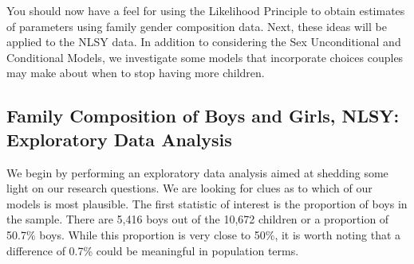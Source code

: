 \documentclass[
]{krantz}
\begin{document}
You should now have a feel for using the Likelihood Principle to obtain estimates of parameters using family gender composition data. Next, these ideas will be applied to the NLSY data. In addition to considering the Sex Unconditional and Conditional Models, we investigate some models that incorporate choices couples may make about when to stop having more children.

\hypertarget{EDA.sec}{%
\subsection{Family Composition of Boys and Girls, NLSY: Exploratory Data Analysis}\label{EDA.sec}}

We begin by performing an exploratory data analysis aimed at shedding some light on our research questions. We are looking for clues as to which of our models is most plausible. The first statistic of interest is the proportion of boys in the sample. There are 5,416 boys out of the 10,672 children or a proportion of 50.7\% boys. While this proportion is very close to 50\%, it is worth noting that a difference of 0.7\% could be meaningful in population terms.

\begin{table}[t]

\caption{\label{tab:table4chp2}Number of families and children in families with given composition. Sex ratio and proportion males are given by family size.}
\centering
{}
\end{table}
\end{document}
